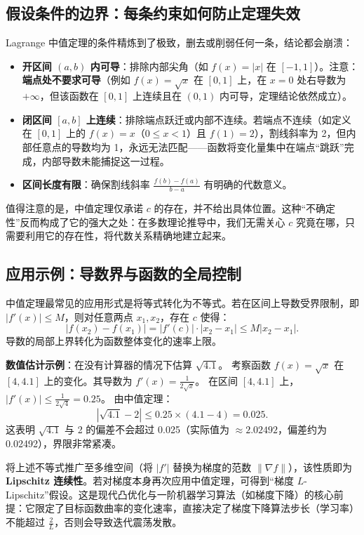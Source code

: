 \subsection{假设条件的边界：每条约束如何防止定理失效}

Lagrange 中值定理的条件精炼到了极致，删去或削弱任何一条，结论都会崩溃：
\begin{itemize}
    \item \textbf{开区间 \((a,b)\) 内可导}：排除内部尖角（如 \(f(x)=|x|\) 在 \([-1,1]\)）。注意：\textbf{端点处不要求可导}（例如 \(f(x)=\sqrt{x}\) 在 \([0,1]\) 上，在 \(x=0\) 处右导数为 \(+\infty\)，但该函数在 \([0,1]\) 上连续且在 \((0,1)\) 内可导，定理结论依然成立）。
    \item \textbf{闭区间 \([a,b]\) 上连续}：排除端点跃迁或内部不连续。若端点不连续（如定义在 \([0,1]\) 上的 \(f(x)=x\)（\(0 \le x < 1\)）且 \(f(1)=2\)），割线斜率为 2，但内部任意点的导数均为 1，永远无法匹配——函数将变化量集中在端点``跳跃''完成，内部导数未能捕捉这一过程。
    \item \textbf{区间长度有限}：确保割线斜率 \(\frac{f(b)-f(a)}{b-a}\) 有明确的代数意义。
\end{itemize}

值得注意的是，中值定理仅承诺 \(c\) 的存在，并不给出具体位置。这种``不确定性''反而构成了它的强大之处：在多数理论推导中，我们无需关心 \(c\) 究竟在哪，只需要利用它的存在性，将代数关系精确地建立起来。

\subsection{应用示例：导数界与函数的全局控制}

中值定理最常见的应用形式是将等式转化为不等式。若在区间上导数受界限制，即 \(|f'(x)| \le M\)，则对任意两点 \(x_1, x_2\)，存在 \(c\) 使得：
\[
|f(x_2) - f(x_1)| = |f'(c)| \cdot |x_2 - x_1| \le M |x_2 - x_1|.
\]
导数的局部上界转化为函数整体变化的速率上限。

\textbf{数值估计示例}：在没有计算器的情况下估算 \(\sqrt{4.1}\)。
考察函数 \(f(x) = \sqrt{x}\) 在 \([4, 4.1]\) 上的变化。其导数为 \(f'(x) = \frac{1}{2\sqrt{x}}\)。
在区间 \([4, 4.1]\) 上，\(|f'(x)| \le \frac{1}{2\sqrt{4}} = 0.25\)。
由中值定理：
\[
|\sqrt{4.1} - 2| \le 0.25 \times (4.1 - 4) = 0.025.
\]
这表明 \(\sqrt{4.1}\) 与 2 的偏差不会超过 0.025（实际值为 \(\approx 2.02492\)，偏差约为 0.02492），界限非常紧凑。

\begin{remark}
将上述不等式推广至多维空间（将 \(|f'|\) 替换为梯度的范数 \(\|\nabla f\|\)），该性质即为 \textbf{Lipschitz 连续性}。若对梯度本身再次应用中值定理，可得到``梯度 \(L\)-Lipschitz''假设。这是现代凸优化与一阶机器学习算法（如梯度下降）的核心前提：它限定了目标函数曲率的变化速率，直接决定了梯度下降算法步长（学习率）不能超过 \(\frac{2}{L}\)，否则会导致迭代震荡发散。
\end{remark}

